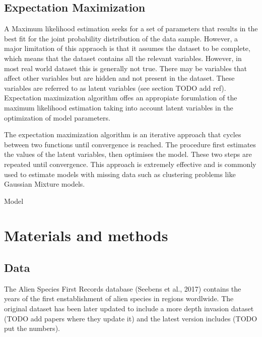 \documentclass[mscthesis]{usiinfthesis}
\begin{document}
\section{Expectation Maximization}

A Maximum likelihood estimation seeks for a set of parameters that results in the best fit for the joint probability distribution of the data sample. However, a major limitation of this appraoch is that it assumes the dataset to be complete, which means that the dataset contains all the relevant variables. However, in most real world dataset this is generally not true. There may be variables that affect other variables but are hidden and not present in the dataset. These variables are referred to as latent variables (see section TODO add ref). Expectation maximization algorithm offes an appropiate forumlation of the maximum likelihood estimation taking into account latent variables in the optimization of model parameters. 

The expectation maximization algorithm is an iterative approach that cycles between two functions until convergence is reached. The procedure first estimates the values of the latent variables, then optimises the model. These two steps are repeated until convergence. This approach is extremely effective and is commonly used to estimate models with missing data such as clustering problems like Gaussian Mixture models. \\

\begin{algorithm}
  \caption{Model}
\end{algorithm}

\chapter{Materials and methods}

\section{Data}

The Alien Species First Records database (Seebens et al., 2017) contains the years of the first enstablishment of alien species in regions wordlwide. The original dataset has been later updated to include a more depth invasion dataset (TODO add papers where they update it) and the latest version includes (TODO put the numbers). 
\end{document}
